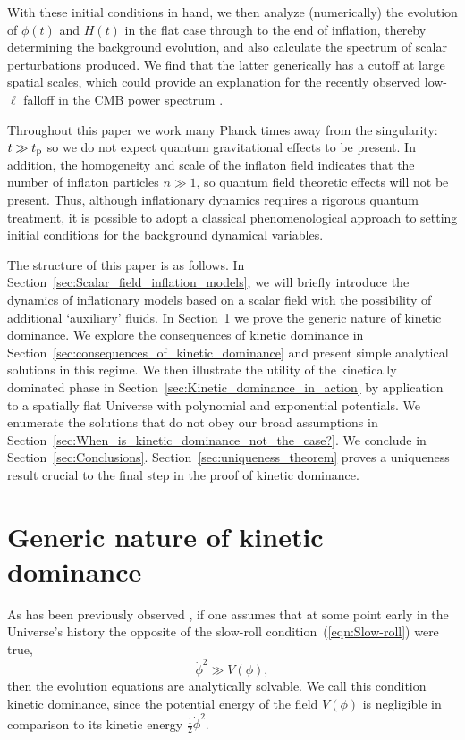 With these initial conditions in hand, we then analyze (numerically) the evolution of $\phi(t)$ and $H(t)$ in the flat case through to the end of inflation, thereby determining the background evolution, and also calculate the spectrum of scalar perturbations produced. We find that the latter generically has a cutoff at large spatial scales, which could provide an explanation for the recently observed low-$\ell$ falloff in the CMB power spectrum \citep{hinshaw_nine-year_2012,planck_collaboration_planck_2013}.
 
Throughout this paper we work many Planck times away from the singularity: $t\gg t_{\mathrm{p}}$ so we do not expect quantum gravitational effects to be present.  In addition, the homogeneity and scale of the inflaton field indicates that the number of inflaton particles $n\gg1$, so quantum field theoretic effects will not be present.  Thus, although inflationary dynamics requires a rigorous quantum treatment, it is possible to adopt a classical phenomenological approach to setting initial conditions for the background dynamical variables.  

The structure of this paper is as follows.  In Section~\ref{sec:Scalar_field_inflation_models}, we will briefly introduce the dynamics of inflationary models based on a scalar field with the possibility of additional `auxiliary' fluids.  In Section~\ref{sec:The_generic_nature_of_kinetic_dominance} we prove the generic nature of kinetic dominance.  We explore the consequences of kinetic dominance in Section~\ref{sec:consequences_of_kinetic_dominance} and present simple analytical solutions in this regime.  We then illustrate the utility of the kinetically dominated phase in Section~\ref{sec:Kinetic_dominance_in_action} by application to a spatially flat Universe with polynomial and exponential potentials.  We enumerate the solutions that do not obey our broad assumptions in Section~\ref{sec:When_is_kinetic_dominance_not_the_case?}.  We conclude in Section~\ref{sec:Conclusions}. Section~\ref{sec:uniqueness_theorem} proves a uniqueness result crucial to the final step in the proof of kinetic dominance.  

\section{Generic nature of kinetic dominance}
\label{sec:The_generic_nature_of_kinetic_dominance}

As has been previously observed \citep{Linde_initial_conditions_1985, belinsky_inflationary_1985,particle_astrophysics_1990}, if one assumes that at some point early in the Universe's history the opposite of the slow-roll condition~(\ref{eqn:Slow-roll}) were true,
%
\begin{equation}
  \dot\phi^2\gg V(\phi),
  \label{eqn:kddef}
\end{equation}
%
then the evolution equations are analytically solvable.  We call this condition kinetic dominance, since the potential energy of the field $V(\phi)$ is negligible in comparison to its kinetic energy $\frac{1}{2}\dot\phi^2$.

